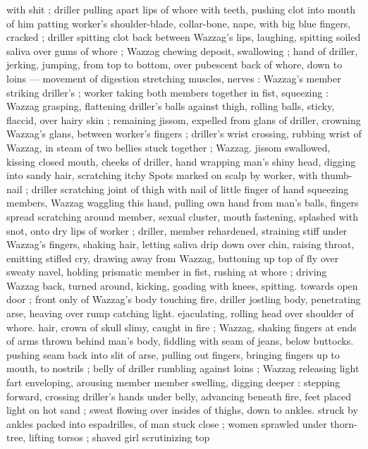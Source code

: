 with shit ; driller pulling apart lips of whore with teeth, pushing clot 
into mouth of him patting worker's shoulder-blade, collar-bone, 
nape, with big blue fingers, cracked ; driller spitting clot back 
between Wazzag's lips, laughing, spitting soiled saliva over gums of 
whore ; Wazzag chewing deposit, swallowing ; hand of driller, jerking, 
jumping, from top to bottom, over pubescent back of whore, down to 
loins --- movement of digestion stretching muscles, nerves : 
Wazzag's member striking driller's ; worker taking both members 
together in fist, squeezing : Wazzag grasping, flattening driller's 
balls against thigh, rolling balls, sticky, flaccid, over hairy skin ; 
remaining jissom, expelled from glans of driller, crowning Wazzag's 
glans, between worker's fingers ; driller's wrist crossing, rubbing 
wrist of Wazzag, in steam of two bellies stuck together ; Wazzag. 
jissom swallowed, kissing closed mouth, cheeks of driller, hand 
wrapping man's shiny head, digging into sandy hair, scratching itchy 
Spots marked on scalp by worker, with thumb-nail ; driller scratching 
joint of thigh with nail of little finger of hand squeezing members, 
Wazzag waggling this hand, pulling own hand from man's balls, 
fingers spread scratching around member, sexual cluster, mouth 
fastening, splashed with snot, onto dry lips of worker ; driller, 
member rehardened, straining stiff under Wazzag's fingers, shaking 
hair, letting saliva drip down over chin, raising throat, emitting stifled 
cry, drawing away from Wazzag, buttoning up top of fly over sweaty 
navel, holding prismatic member in fist, rushing at whore ; driving 
Wazzag back, turned around, kicking, goading with knees, spitting. 
towards open door ; front only of Wazzag's body touching fire, driller 
jostling body, penetrating arse, heaving over rump catching light. 
ejaculating, rolling head over shoulder of whore. hair, crown of skull 
slimy, caught in fire ; Wazzag, shaking fingers at ends of arms thrown 
behind man's body, fiddling with seam of jeans, below buttocks. 
pushing seam back into slit of arse, pulling out fingers, bringing 
fingers up to mouth, to nostrils ; belly of driller rumbling against 
loins ; Wazzag releasing light fart enveloping, arousing member 
member swelling, digging deeper : stepping forward, crossing 
driller's hands under belly, advancing beneath fire, feet placed light 
on hot sand ; sweat flowing over insides of thighs, down to ankles. 
struck by ankles packed into espadrilles, of man stuck close ; women 
sprawled under thorn-tree, lifting torsos ; shaved girl scrutinizing top 
